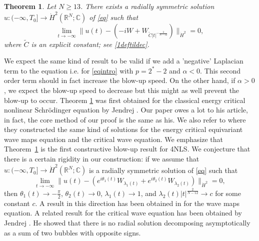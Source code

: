 \documentclass[a4paper,two-side,10pt]{amsart}
\newtheorem{thm}{Theorem}[section]
\newcommand{\R}{\mathbb{R}}
\numberwithin{equation}{section}
\begin{document}
\begin{thm}
\label{main}
Let $N\geq 13$. There exists a radially symmetric solution $u:(-\infty , T_0] \rightarrow \dot{H}^2 (\R^N ; \mathbb{C} )$ of \eqref{eq} such that
$$\lim_{t\rightarrow -\infty} \|u(t)- (-i W + W_{\tilde{C} |t|^{-\frac{2}{N-12}}})\|_{\dot{H}^2}=0,$$
where $\tilde{C}$ is an explicit constant; see \eqref{1deftildec}.
\end{thm}
 We expect the same kind of result to be valid if we add a 'negative' Laplacian term to the equation i.e. for \eqref{eqintro} with $p=2^\ast -2$ and $\alpha <0$. This second order term should in fact increase the blow-up speed. On the other hand, if $\alpha >0$, we expect the blow-up speed to decrease but this might as well prevent the blow-up to occur.
Theorem \ref{main} was first obtained for the classical energy critical nonlinear Schr\" odin\-ger equation by Jendrej \cite{JJ}. Our paper owes a lot to his article, in fact, the core method of our proof is the same as his.  
We also refer to \cite{MR3904767} where they constructed the same kind of solutions for the energy critical equivariant wave maps equation and the critical wave equation. We emphasize that Theorem~\ref{main} is the first constructive blow-up result for 4NLS. We conjecture that there is a certain rigidity in our construction: if we assume that $u:(-\infty , T_0] \rightarrow \dot{H}^2 (\R^N ; \mathbb{C} )$ is a radially symmetric solution of \eqref{eq} such that
$$\lim_{t\rightarrow -\infty} \|u(t)- (e^{i\theta_1 (t)} W_{\lambda_1 (t)} +e^{i\theta_2 (t)} W_{\lambda_2 (t)})\|_{\dot{H}^2}=0,$$   
then $\theta_1 (t) \rightarrow -\frac{\pi}{2}$, $\theta_2(t) \rightarrow 0$, $\lambda_1(t) \rightarrow 1$, and $\lambda_2 (t) |t|^{\frac{2}{N-12}} \rightarrow c$ for some constant $c$. A result in this direction has been obtained in \cite{MR3842064} for the wave maps equation. A related result for the critical wave equation has been obtained by Jendrej \cite{MR3801295}. He showed that there is no radial solution decomposing asymptotically as a sum of two bubbles with opposite signs. 
\end{document}
